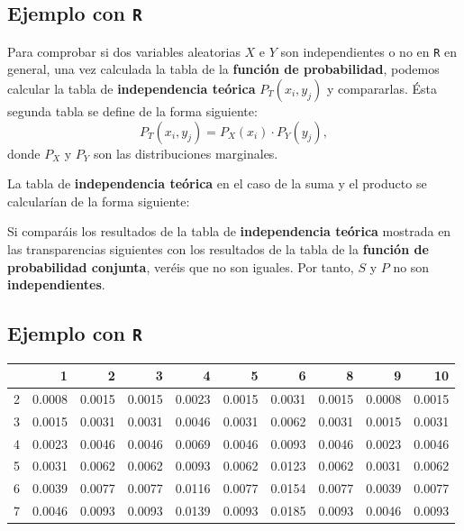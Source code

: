 \documentclass[]{book}
\newenvironment{Shaded}{\begin{snugshade}}{\end{snugshade}}
\newcommand{\KeywordTok}[1]{\textcolor[rgb]{0.13,0.29,0.53}{\textbf{#1}}}
\newcommand{\NormalTok}[1]{#1}
\newcommand{\OperatorTok}[1]{\textcolor[rgb]{0.81,0.36,0.00}{\textbf{#1}}}
\newcommand{\StringTok}[1]{\textcolor[rgb]{0.31,0.60,0.02}{#1}}
\begin{document}
\hypertarget{ejemplo-con-r}{%
\subsection{\texorpdfstring{Ejemplo con \texttt{R}}{Ejemplo con R}}\label{ejemplo-con-r}}

Para comprobar si dos variables aleatorias \(X\) e \(Y\) son independientes o no en \texttt{R} en general, una vez calculada la tabla de la \textbf{función de probabilidad}, podemos calcular la tabla de \textbf{independencia teórica} \(P_T(x_i,y_j)\) y compararlas. Ésta segunda tabla se define de la forma siguiente:
\[
P_T(x_i,y_j)=P_X(x_i)\cdot P_Y(y_j),
\]
donde \(P_X\) y \(P_Y\) son las distribuciones marginales.

La tabla de \textbf{independencia teórica } en el caso de la suma y el producto se calcularían de la forma siguiente:

\begin{Shaded}
\end{Shaded}

Si comparáis los resultados de la tabla de \textbf{independencia teórica} mostrada en las transparencias siguientes con los resultados de la tabla de la \textbf{función de probabilidad conjunta}, veréis que no son iguales. Por tanto, \(S\) y \(P\) no son \textbf{independientes}.

\hypertarget{ejemplo-con-r-1}{%
\subsection{\texorpdfstring{Ejemplo con \texttt{R}}{Ejemplo con R}}\label{ejemplo-con-r-1}}

\begin{tabular}{l|r|r|r|r|r|r|r|r|r}
\hline
  & 1 & 2 & 3 & 4 & 5 & 6 & 8 & 9 & 10\\
\hline
2 & 0.0008 & 0.0015 & 0.0015 & 0.0023 & 0.0015 & 0.0031 & 0.0015 & 0.0008 & 0.0015\\
\hline
3 & 0.0015 & 0.0031 & 0.0031 & 0.0046 & 0.0031 & 0.0062 & 0.0031 & 0.0015 & 0.0031\\
\hline
4 & 0.0023 & 0.0046 & 0.0046 & 0.0069 & 0.0046 & 0.0093 & 0.0046 & 0.0023 & 0.0046\\
\hline
5 & 0.0031 & 0.0062 & 0.0062 & 0.0093 & 0.0062 & 0.0123 & 0.0062 & 0.0031 & 0.0062\\
\hline
6 & 0.0039 & 0.0077 & 0.0077 & 0.0116 & 0.0077 & 0.0154 & 0.0077 & 0.0039 & 0.0077\\
\hline
7 & 0.0046 & 0.0093 & 0.0093 & 0.0139 & 0.0093 & 0.0185 & 0.0093 & 0.0046 & 0.0093\\
\hline
\end{tabular}
\end{document}
